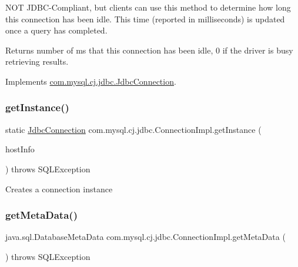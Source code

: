N\+OT J\+D\+B\+C-\/\+Compliant, but clients can use this method to determine how long this connection has been idle. This time (reported in milliseconds) is updated once a query has completed.

\begin{DoxyReturn}{Returns}
number of ms that this connection has been idle, 0 if the driver is busy retrieving results. 
\end{DoxyReturn}


Implements \mbox{\hyperlink{interfacecom_1_1mysql_1_1cj_1_1jdbc_1_1_jdbc_connection_a3a242d2fb1e6c443f163d55f8bbd6cde}{com.\+mysql.\+cj.\+jdbc.\+Jdbc\+Connection}}.

\mbox{\label{classcom_1_1mysql_1_1cj_1_1jdbc_1_1_connection_impl_a00ebf86453e09df7221526f2544f6960}} 
\subsubsection{\texorpdfstring{get\+Instance()}{getInstance()}}
{\footnotesize\ttfamily static \mbox{\hyperlink{interfacecom_1_1mysql_1_1cj_1_1jdbc_1_1_jdbc_connection}{Jdbc\+Connection}} com.\+mysql.\+cj.\+jdbc.\+Connection\+Impl.\+get\+Instance (\begin{DoxyParamCaption}\item[{\mbox{\hyperlink{classcom_1_1mysql_1_1cj_1_1conf_1_1_host_info}{Host\+Info}}}]{host\+Info }\end{DoxyParamCaption}) throws S\+Q\+L\+Exception\hspace{0.3cm}{\ttfamily [static]}}

Creates a connection instance \mbox{\label{classcom_1_1mysql_1_1cj_1_1jdbc_1_1_connection_impl_acece4c22f0678d1b70d487c8658f1d49}} 
\subsubsection{\texorpdfstring{get\+Meta\+Data()}{getMetaData()}}
{\footnotesize\ttfamily java.\+sql.\+Database\+Meta\+Data com.\+mysql.\+cj.\+jdbc.\+Connection\+Impl.\+get\+Meta\+Data (\begin{DoxyParamCaption}{ }\end{DoxyParamCaption}) throws S\+Q\+L\+Exception}

